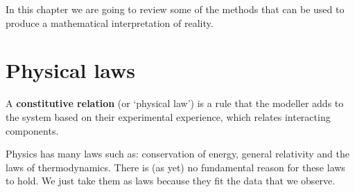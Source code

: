 In this chapter we are going to review some of the methods that can be used to produce a mathematical interpretation of reality.

\section{Physical laws}
\begin{defin}
A \textbf{constitutive relation} (or `physical law') is a rule that the modeller adds to the system based on their experimental experience, which relates interacting components.
\end{defin}
Physics has many laws such as: conservation of energy, general relativity and the laws of thermodynamics. There is (as yet) no fundamental reason for these laws to hold. We just take them as laws because they fit the data that we observe.

